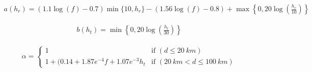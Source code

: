 \begin{align} 
\label{eqn:COSTModelExtendedhr}
a(h_r)=(1.1\log(f)-0.7) \min\{10,h_r\}-(1.56\log(f)-0.8)+\max\left\{0,20\log\left(\frac{h_r}{10}\right)\right\}
\end{align} 

\begin{align} 
\label{eqn:COSTModelExtendedht}
b(h_t)= \min\left\{0,20\log\left(\frac{h_t}{30}\right)\right\}
\end{align} 

\begin{align} 
\label{eqn:aplhacostextended}
\alpha = 
  \begin{cases}
      1 & \text{if } (d \leq \SI{20}{km}) \\
    1+(0.14+1.87e^{-4} f + 1.07e^{-3} h_t & \text{if } (\SI{20}{km} < d \leq \SI{100}{km})
  \end{cases}
\end{align} 
